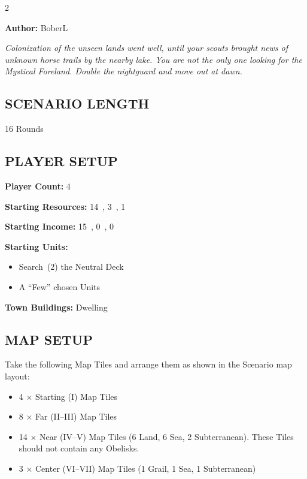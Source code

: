 
\begin{multicols}{2}
\enlargethispage{\baselineskip}

\textbf{Author:} BoberL

\textit{Colonization of the unseen lands went well, until your scouts brought news of unknown horse trails by the nearby lake.
You are not the only one looking for the Mystical Foreland.
Double the nightguard and move out at dawn.}  %

\subsection*{\MakeUppercase{Scenario Length}}
16 Rounds

\subsection*{\MakeUppercase{Player Setup}}
\textbf{Player Count:} 4

\textbf{Starting Resources:} 14~, 3~, 1~

\textbf{Starting Income:} 15~, 0~, 0~

\textbf{Starting Units:}

\begin{itemize}
  \item Search~(2) the  Neutral Deck
  \item A ``Few'' chosen  Units
\end{itemize}

\textbf{Town Buildings:}  Dwelling

\subsection*{\MakeUppercase{Map Setup}}
Take the following Map Tiles and arrange them as shown in the Scenario map layout:

\begin{itemize}
  \item 4 × Starting (I) Map Tiles
  \item 8 × Far (II--III) Map Tiles
  \item 14 × Near (IV--V) Map Tiles (6 Land, 6 Sea, 2 Subterranean). These Tiles should not contain any Obelisks.
  \item 3 × Center (VI--VII) Map Tiles (1 Grail, 1 Sea, 1 Subterranean)
\end{itemize}


\end{multicols}
